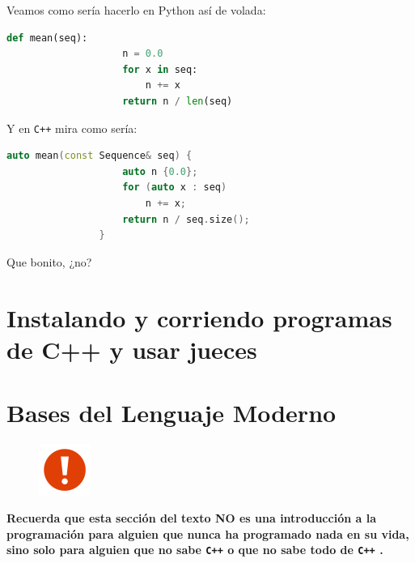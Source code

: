 \documentclass[12pt, fleqn]{report}                             %
\theoremstyle{break}                                            %
\newcommand{\textCode}[1]  { \texttt{#1} }                      %
\newcommand{\Cpp}{\ignorespaces\textCode{C++}}                  %
\begin{document}
            Veamos como sería hacerlo en Python así de volada:
            \begin{lstlisting}[language=python, gobble=16]
                def mean(seq):
                    n = 0.0
                    for x in seq:
                        n += x
                    return n / len(seq)
            \end{lstlisting}

            Y en \Cpp mira como sería:
            \begin{lstlisting}[language=C++, gobble=16]
                auto mean(const Sequence& seq) {
                    auto n {0.0};
                    for (auto x : seq)
                        n += x;
                    return n / seq.size();
                }
            \end{lstlisting}

            Que bonito, ¿no?
            \cite{ModernCppWhatYouNeedToKnow}

    \clearpage
    \chapter{Instalando y corriendo programas de C++ y usar jueces}


    \clearpage
    \chapter{Bases del Lenguaje Moderno}

        \begin{figure}
            \centering
            \includegraphics[width=0.15\textwidth]{Warning}
        \end{figure}

        \textbf{
            Recuerda que esta sección del texto NO es una introducción a la programación para
            alguien que nunca ha programado nada en su vida, sino solo para alguien que
            no sabe \Cpp o que no sabe todo de \Cpp.
        }
\end{document}
